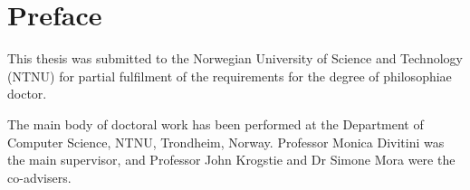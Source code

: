 \chapter{Preface}

This thesis was submitted to the Norwegian University of Science and Technology (NTNU) for partial fulfilment of the requirements for the degree of philosophiae doctor.

The main body of doctoral work has been performed at the Department of Computer Science, NTNU, Trondheim, Norway. Professor Monica Divitini was the main supervisor, and Professor John Krogstie and Dr Simone Mora were the co-advisers.